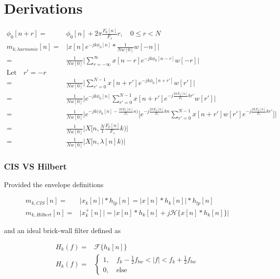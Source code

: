 \documentclass [11pt, proquest,oneside] {ganter_thesis}[2015/03/03]
\begin{document}
\chapter{Derivations}


\begin{align}
\phi_0[n + r] =& \phi_0[n] + 2\pi \frac{F_0[n]}{F_s}r, \quad 0 \leq r < N \\
m_{k,harmonic}[n] =& \Bigg| x[n] e^{-jk\phi_0 [n]} *  \frac{1}{Nw[0]} w[-n] \Bigg| \nonumber \\
=& \frac{1}{Nw[0]} \Bigg| \sum_{r = -\infty}^\infty x[n - r] e^{-jk\phi_0 [n-r]} w[-r] \Bigg| \nonumber \\
\textrm{Let} \quad r' = -r \nonumber \\
=& \frac{1}{Nw[0]} \Bigg| \sum_{r' = 0}^{N-1} x[n + r'] e^{-jk\phi_0 [n + r']} w[r'] \Bigg|  \nonumber \\
=& \frac{1}{Nw[0]} \Bigg| e^{-jk \phi_0[n]} \sum_{r' = 0}^{N-1} x[n + r'] e^{-j \frac{2\pi F_0[n]}{F_s}kr'} w[r'] \Bigg| \nonumber \\
=& \frac{1}{Nw[0]} \Bigg| e^{-jk \Big(\phi_0[n] - \frac{2\pi F_0[n]}{F_s}n \Big)} \Bigg[ e^{-j \frac{2\pi F_0[n]}{F_s}kn} \sum_{r' = 0}^{N-1} x[n + r'] w[r'] e^{-j \frac{2\pi F_0[n]}{F_s}kr'} \Bigg] \Bigg| \nonumber \\
=& \frac{1}{Nw[0]} \Bigg| X\Big[n, \frac{N}{1} \frac{F_0[n]}{F_s} k \Big) \Bigg| \nonumber \\
\label{eq:harmonic-to-stft}
=& \frac{1}{Nw[0]} \Bigg| X\Big[n, \lambda[n]k\Big) \Bigg|
\end{align}

\subsection{CIS VS Hilbert}

Provided the envelope definitions

\begin{align}
m_{k,CIS}[n] =& \Big| x_k[n] \Big| * h_{lp}[n] = \Big| x[n] * h_k[n] \Big| * h_{lp}[n] \nonumber \\
m_{k,Hilbert}[n] =& \Big| x^+_k[n] \Big| = \Big| x[n] * h_k[n] + j\mathcal{H}\{x[n] * h_k[n]\} \Big| \nonumber
\end{align}

and an ideal brick-wall filter defined as

\begin{align}
H_k(f) =& \mathcal{F}\Big\{ h_k[n]  \Big\} \\
H_k(f) =& \left\{
                \begin{array}{ll}
                1, \quad f_k - \frac{1}{2} f_{bw} < |f| < f_k + \frac{1}{2} f_{bw} \\
                0, \quad \mathrm{else}
                \end{array}
              \right.
\end{align}
\end{document}
